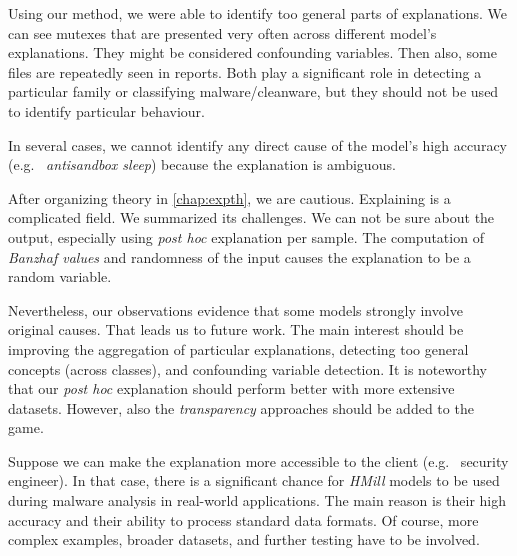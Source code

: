 Using our method, we were able to identify too general parts of explanations. We can see mutexes that are presented very often across different model's explanations. They might be considered confounding variables. Then also, some files are repeatedly seen in reports. Both play a significant role in detecting a particular family or classifying malware/cleanware, but they should not be used to identify particular behaviour.

In several cases, we cannot identify any direct cause of the model's high accuracy (e.g. \ \emph{antisandbox sleep}) because the explanation is ambiguous.

\hfill \break

After organizing theory in \ref{chap:expth}, we are cautious. Explaining is a complicated field. We summarized its challenges. We can not be sure about the output, especially using \emph{post hoc} explanation per sample. The computation of \emph{Banzhaf values} and randomness of the input causes the explanation to be a random variable. 

Nevertheless, our observations evidence that some models strongly involve original causes. That leads us to future work. The main interest should be improving the aggregation of particular explanations, detecting too general concepts (across classes), and confounding variable detection. It is noteworthy that our \emph{post hoc} explanation should perform better with more extensive datasets. However, also the \emph{transparency} approaches should be added to the game. 

Suppose we can make the explanation more accessible to the client (e.g. \ security engineer). In that case, there is a significant chance for \emph{HMill} models to be used during malware analysis in real-world applications. The main reason is their high accuracy and their ability to process standard data formats. Of course, more complex examples, broader datasets, and further testing have to be involved.
